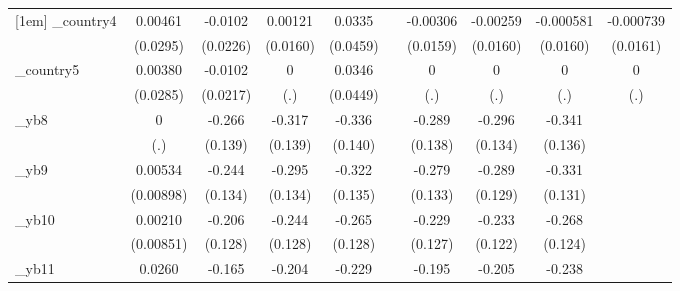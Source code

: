 \begin{table}[htbp]
\begin{tabular}{l*{9}{c}}
[1em]
\_country4   &     0.00461         &     -0.0102         &     0.00121         &      0.0335         &                     &    -0.00306         &    -0.00259         &   -0.000581         &   -0.000739         \\
            &    (0.0295)         &    (0.0226)         &    (0.0160)         &    (0.0459)         &                     &    (0.0159)         &    (0.0160)         &    (0.0160)         &    (0.0161)         \\
[1em]
\_country5   &     0.00380         &     -0.0102         &           0         &      0.0346         &                     &           0         &           0         &           0         &           0         \\
            &    (0.0285)         &    (0.0217)         &         (.)         &    (0.0449)         &                     &         (.)         &         (.)         &         (.)         &         (.)         \\
[1em]
\_yb8        &           0         &      -0.266\sym{*}  &      -0.317\sym{**} &      -0.336\sym{**} &                     &      -0.289\sym{**} &      -0.296\sym{**} &      -0.341\sym{**} &                     \\
            &         (.)         &     (0.139)         &     (0.139)         &     (0.140)         &                     &     (0.138)         &     (0.134)         &     (0.136)         &                     \\
[1em]
\_yb9        &     0.00534         &      -0.244\sym{*}  &      -0.295\sym{**} &      -0.322\sym{**} &                     &      -0.279\sym{**} &      -0.289\sym{**} &      -0.331\sym{**} &                     \\
            &   (0.00898)         &     (0.134)         &     (0.134)         &     (0.135)         &                     &     (0.133)         &     (0.129)         &     (0.131)         &                     \\
[1em]
\_yb10       &     0.00210         &      -0.206         &      -0.244\sym{*}  &      -0.265\sym{**} &                     &      -0.229\sym{*}  &      -0.233\sym{*}  &      -0.268\sym{**} &                     \\
            &   (0.00851)         &     (0.128)         &     (0.128)         &     (0.128)         &                     &     (0.127)         &     (0.122)         &     (0.124)         &                     \\
[1em]
\_yb11       &      0.0260         &      -0.165         &      -0.204         &      -0.229\sym{*}  &                     &      -0.195         &      -0.205\sym{*}  &      -0.238\sym{*}  &                     \\

\end{tabular}
\end{table}

